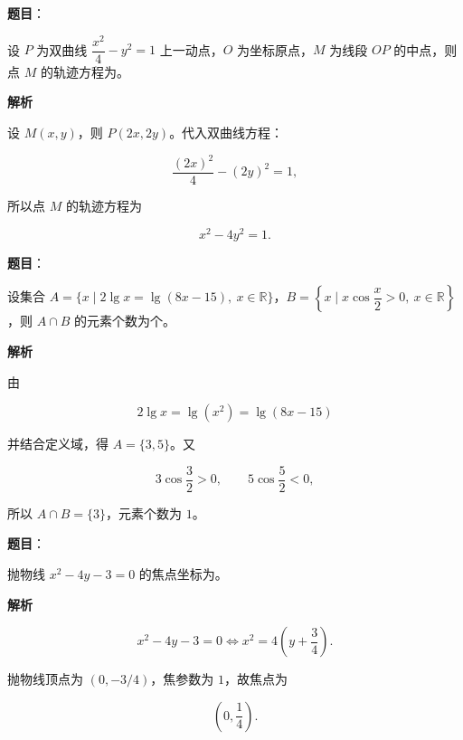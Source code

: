 \begin{answer}

\textbf{题目}：

设 $P$ 为双曲线 $\dfrac{x^2}{4}-y^2=1$ 上一动点，$O$ 为坐标原点，$M$ 为线段 $OP$ 的中点，则点 $M$ 的轨迹方程为\gkblank{}。

\textbf{解析}

设 $M(x,y)$，则 $P(2x,2y)$。代入双曲线方程：

\nopagebreak[4]
\[
\frac{(2x)^2}{4}-(2y)^2=1,
\]

所以点 $M$ 的轨迹方程为

\nopagebreak[4]
\[
x^2-4y^2=1.
\]


\end{answer}
\begin{answer}

\textbf{题目}：

设集合 $A=\{x\mid 2\lg x=\lg(8x-15),\ x\in\mathbb R\}$，$B=\left\{x\mid x\cos\dfrac{x}{2}>0,\ x\in\mathbb R\right\}$，则 $A\cap B$ 的元素个数为\gkblank{}个。

\textbf{解析}

由

\nopagebreak[4]
\[
2\lg x=\lg(x^2)=\lg(8x-15)
\]

并结合定义域，得 $A=\{3,5\}$。又

\nopagebreak[4]
\[
3\cos\frac32>0,\qquad 5\cos\frac52<0,
\]

所以 $A\cap B=\{3\}$，元素个数为 $1$。


\end{answer}
\begin{answer}

\textbf{题目}：

抛物线 $x^2-4y-3=0$ 的焦点坐标为\gkblank{}。

\textbf{解析}

\nopagebreak[4]
\[
x^2-4y-3=0
\Longleftrightarrow x^2=4\left(y+\frac34\right).
\]

抛物线顶点为 $(0,-3/4)$，焦参数为 $1$，故焦点为

\nopagebreak[4]
\[
\left(0,\frac14\right).
\]


\end{answer}
